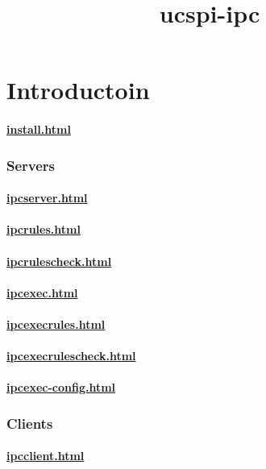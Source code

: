 \documentclass{book}
\title{ucspi-ipc}
\begin{document}
\section{Introductoin}

\paragraph{\href{How to install ucspi-ipc}{install.html}}

\subsubsection{Servers}
\paragraph{\href{The \cmd{ipcserver} program}{ipcserver.html}}
\paragraph{\href{The \cmd{ipcrules} program}{ipcrules.html}}
\paragraph{\href{The \cmd{ipcrulescheck} program}{ipcrulescheck.html}}

\paragraph{\href{The \cmd{ipcexec} program}{ipcexec.html}}
\paragraph{\href{The \cmd{ipcexecrules} program}{ipcexecrules.html}}
\paragraph{\href{The \cmd{ipcexecrulescheck} program}{ipcexecrulescheck.html}}
\paragraph{\href{The \cmd{ipcexec-config} program}{ipcexec-config.html}}

\subsubsection{Clients}
\paragraph{\href{The \cmd{ipcclient} program}{ipcclient.html}}
\end{document}
